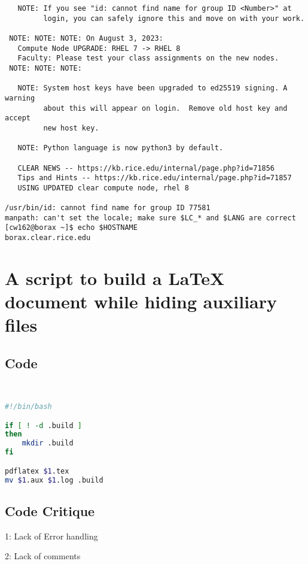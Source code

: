 \documentclass{article}
\begin{document}
\begin{verbatim}
   NOTE: If you see "id: cannot find name for group ID <Number>" at 
         login, you can safely ignore this and move on with your work.
 
 NOTE: NOTE: NOTE: On August 3, 2023:
   Compute Node UPGRADE: RHEL 7 -> RHEL 8
   Faculty: Please test your class assignments on the new nodes.
 NOTE: NOTE: NOTE:
 
   NOTE: System host keys have been upgraded to ed25519 signing. A warning
         about this will appear on login.  Remove old host key and accept
         new host key.
 
   NOTE: Python language is now python3 by default.
 
   CLEAR NEWS -- https://kb.rice.edu/internal/page.php?id=71856
   Tips and Hints -- https://kb.rice.edu/internal/page.php?id=71857
   USING UPDATED clear compute node, rhel 8
 
/usr/bin/id: cannot find name for group ID 77581
manpath: can't set the locale; make sure $LC_* and $LANG are correct
[cw162@borax ~]$ echo $HOSTNAME
borax.clear.rice.edu

\end{verbatim}

\section{A script to build a LaTeX document while hiding auxiliary files}
\subsection{Code}
\begin{lstlisting}[language=bash, caption={clean-build.sh}]


#!/bin/bash

if [ ! -d .build ]
then
	mkdir .build
fi

pdflatex $1.tex
mv $1.aux $1.log .build
\end{lstlisting}
\subsection{Code Critique}

1: Lack of Error handling

2: Lack of comments
\end{document}
